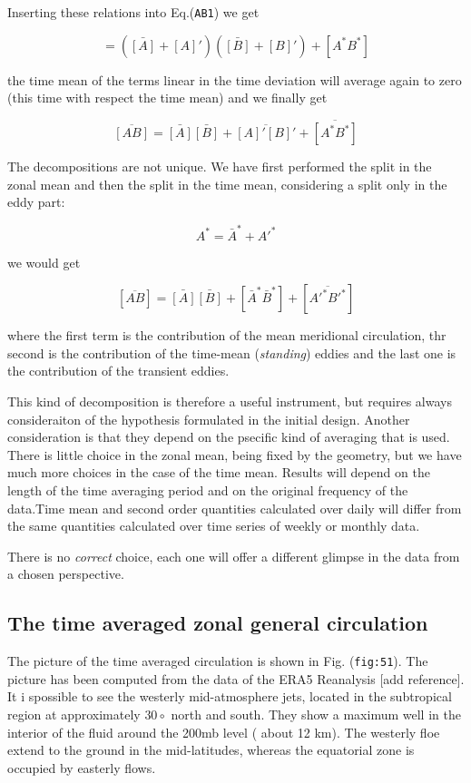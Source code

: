 Inserting these relations into Eq.(\texttt{AB1}) we get

\[= (\bar{[A]} + [A]')(\bar{[B]} + [B]') + [A^*B^*]\]

the time mean of the terms linear in the time deviation will average
again to zero (this time with respect the time mean) and we finally get

\[\overline{[AB]} = \bar{[A]}\bar{[B]} + \overline{[A]'[B]'} + \overline{[A^*B^*]}\]

The decompositions are not unique. We have first performed the split in
the zonal mean and then the split in the time mean, considering a split
only in the eddy part:

\[A^* =    \bar{A}^* + A'^*\]

we would get

\[[ \overline{AB}] = \bar{[A]}\bar{[B]} +  [\bar{A}^*\bar{B}^*]+[\overline{A'^*B'^*} ]\]

where the first term is the contribution of the mean meridional
circulation, thr second is the contribution of the time-mean
(\emph{standing}) eddies and the last one is the contribution of the
transient eddies.

This kind of decomposition is therefore a useful instrument, but
requires always consideraiton of the hypothesis formulated in the
initial design. Another consideration is that they depend on the
psecific kind of averaging that is used. There is little choice in the
zonal mean, being fixed by the geometry, but we have much more choices
in the case of the time mean. Results will depend on the length of the
time averaging period and on the original frequency of the data.Time
mean and second order quantities calculated over daily will differ from
the same quantities calculated over time series of weekly or monthly
data.

There is no \emph{correct} choice, each one will offer a different
glimpse in the data from a chosen perspective.

\subsection{The time averaged zonal general
circulation}\label{the-time-averaged-zonal-general-circulation}

The picture of the time averaged circulation is shown in Fig.
(\texttt{fig:51}). The picture has been computed from the data of the
ERA5 Reanalysis {[}add reference{]}. It i spossible to see the westerly
mid-atmosphere jets, located in the subtropical region at approximately
\(30\circ\) north and south. They show a maximum well in the interior of
the fluid around the 200mb level ( about 12 km). The westerly floe
extend to the ground in the mid-latitudes, whereas the equatorial zone
is occupied by easterly flows.

